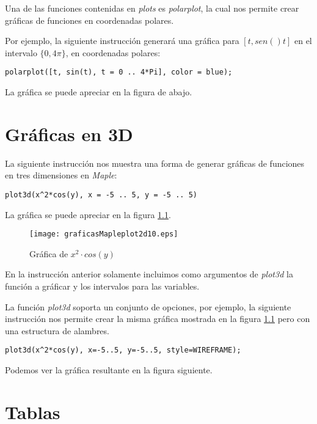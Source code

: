 \documentclass[letterpaper,12pt]{book}
\begin{document}
Una de las funciones contenidas en \emph{plots} es \emph{polarplot}, la cual nos
permite crear gráficas de funciones en coordenadas polares.

Por ejemplo, la siguiente instrucción generará una gráfica para 
$[t, sen()t]$ en el intervalo $\{0, 4\pi\}$, en coordenadas polares:

\begin{verbatim}
polarplot([t, sin(t), t = 0 .. 4*Pi], color = blue);
\end{verbatim}

La gráfica se puede apreciar en la figura de abajo.


\chapter{Gráficas en 3D}

La siguiente instrucción nos muestra una forma de generar gráficas de funciones en tres dimensiones en \emph{Maple}:

\begin{verbatim}
plot3d(x^2*cos(y), x = -5 .. 5, y = -5 .. 5)
\end{verbatim}

La gráfica se puede apreciar en la figura \ref{cap6f1}.

\begin{figure}[h!]
\centering
\texttt{[image: graficasMapleplot2d10.eps]}
\caption{Gráfica de $x^2\cdot cos(y)$}\label{cap6f1}
\end{figure}

En la instrucción anterior solamente incluimos como argumentos de \emph{plot3d} la función 
a gráficar y los intervalos para las variables.

La función \emph{plot3d} soporta un conjunto de opciones, por ejemplo, la siguiente instrucción 
nos permite crear la misma gráfica mostrada en la figura \ref{cap6f1} pero con una estructura de
alambres.

\begin{verbatim}
plot3d(x^2*cos(y), x=-5..5, y=-5..5, style=WIREFRAME);
\end{verbatim}

Podemos ver la gráfica resultante en la figura siguiente.


\chapter{Tablas}
\end{document}
